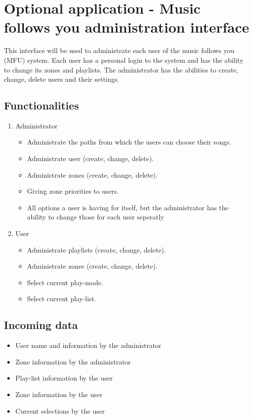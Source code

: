   \section{Optional application - Music follows you administration interface}
   \label{sec:design:MFUAdmin}
   This interface will be used to administrate each user of the music follows you (MFU) system. Each user has a personal login to the system and has the ability to change its zones and playlists. The administrator has the abilities to create, change, delete users and their settings.
   
   \subsection{Functionalities}
   \begin{enumerate}
    \item Administrator
       \begin{itemize}
        \item Administrate the paths from which the users can choose their songs.
        \item Administrate user (create, change, delete).
        \item Administrate zones (create, change, delete).
        \item Giving zone priorities to users.
        \item All options a user is having for itself, but the administrator has the ability to change those for each user seperatly
       \end{itemize}
    \item User
       \begin{itemize}
        \item Administrate playlists (create, change, delete).
        \item Administrate zones (create, change, delete).
        \item Select current play-mode.
        \item Select current play-list.
       \end{itemize}
   \end{enumerate}

   \subsection{Incoming data}
    \begin{itemize}
     \item User name and information by the administrator
     \item Zone information by the administrator
     \item Play-list information by the user
     \item Zone information by the user
     \item Current selections by the user
    \end{itemize}

